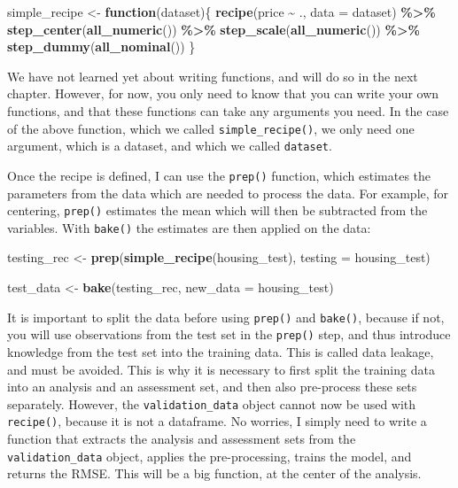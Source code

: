 \documentclass[
]{article}
\newenvironment{Shaded}{\begin{snugshade}}{\end{snugshade}}
\newcommand{\ControlFlowTok}[1]{\textcolor[rgb]{0.13,0.29,0.53}{\textbf{#1}}}
\newcommand{\DataTypeTok}[1]{\textcolor[rgb]{0.13,0.29,0.53}{#1}}
\newcommand{\KeywordTok}[1]{\textcolor[rgb]{0.13,0.29,0.53}{\textbf{#1}}}
\newcommand{\NormalTok}[1]{#1}
\newcommand{\OperatorTok}[1]{\textcolor[rgb]{0.81,0.36,0.00}{\textbf{#1}}}
\newcommand{\StringTok}[1]{\textcolor[rgb]{0.31,0.60,0.02}{#1}}
\begin{document}
\begin{Shaded}
\begin{Highlighting}[]
\NormalTok{simple\_recipe \textless{}{-}}\StringTok{ }\ControlFlowTok{function}\NormalTok{(dataset)\{}
    \KeywordTok{recipe}\NormalTok{(price }\OperatorTok{\textasciitilde{}}\StringTok{ }\NormalTok{., }\DataTypeTok{data =}\NormalTok{ dataset) }\OperatorTok{\%\textgreater{}\%}
\StringTok{        }\KeywordTok{step\_center}\NormalTok{(}\KeywordTok{all\_numeric}\NormalTok{()) }\OperatorTok{\%\textgreater{}\%}
\StringTok{        }\KeywordTok{step\_scale}\NormalTok{(}\KeywordTok{all\_numeric}\NormalTok{()) }\OperatorTok{\%\textgreater{}\%}
\StringTok{        }\KeywordTok{step\_dummy}\NormalTok{(}\KeywordTok{all\_nominal}\NormalTok{())}
\NormalTok{\}}
\end{Highlighting}
\end{Shaded}

We have not learned yet about writing functions, and will do so in the next chapter. However, for
now, you only need to know that you can write your own functions, and that these functions can
take any arguments you need. In the case of the above function, which we called \texttt{simple\_recipe()},
we only need one argument, which is a dataset, and which we called \texttt{dataset}.

Once the recipe is defined, I can use the \texttt{prep()} function, which estimates the parameters from
the data which are needed to process the data. For example, for centering, \texttt{prep()} estimates
the mean which will then be subtracted from the variables. With \texttt{bake()} the estimates are then
applied on the data:

\begin{Shaded}
\begin{Highlighting}[]
\NormalTok{testing\_rec \textless{}{-}}\StringTok{ }\KeywordTok{prep}\NormalTok{(}\KeywordTok{simple\_recipe}\NormalTok{(housing\_test), }\DataTypeTok{testing =}\NormalTok{ housing\_test)}

\NormalTok{test\_data \textless{}{-}}\StringTok{ }\KeywordTok{bake}\NormalTok{(testing\_rec, }\DataTypeTok{new\_data =}\NormalTok{ housing\_test)}
\end{Highlighting}
\end{Shaded}

It is important to split the data before using \texttt{prep()} and \texttt{bake()}, because if not, you will
use observations from the test set in the \texttt{prep()} step, and thus introduce knowledge from the test
set into the training data. This is called data leakage, and must be avoided. This is why it is
necessary to first split the training data into an analysis and an assessment set, and then also
pre-process these sets separately. However, the \texttt{validation\_data} object cannot now be used with
\texttt{recipe()}, because it is not a dataframe. No worries, I simply need to write a function that extracts
the analysis and assessment sets from the \texttt{validation\_data} object, applies the pre-processing, trains
the model, and returns the RMSE. This will be a big function, at the center of the analysis.
\end{document}
